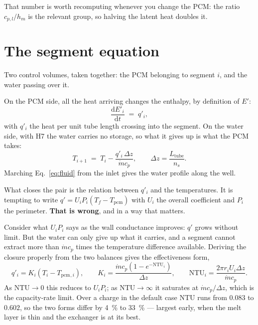 \documentclass[11pt,a4paper]{article}
\newcommand{\md}{\ensuremath{\dot m}}
\newcommand{\Ui}{\ensuremath{U_{i}}}
\newcommand{\hm}{\ensuremath{h_{m}}}
\newcommand{\Tpcm}{\ensuremath{T_{\mathrm{pcm}}}}
\begin{document}
That number is worth recomputing whenever you change the PCM: the ratio
$c_{p,l}/\hm$ is the relevant group, so halving the latent heat doubles it.

\section{The segment equation}
\label{sec:segment}

Two control volumes, taken together: the PCM belonging to segment $i$, and the
water passing over it.

On the PCM side, all the heat arriving changes the enthalpy, by definition of
$E'$:
\begin{equation}
  \frac{\mathrm{d}E'_i}{\mathrm{d}t} \;=\; q'_i ,
  \label{eq:pcm}
\end{equation}
with $q'_i$ the heat per unit tube length crossing into the segment. On the
water side, with H7 the water carries no storage, so what it gives up is what
the PCM takes:
\begin{equation}
  T_{i+1} \;=\; T_i - \frac{q'_i\,\Delta z}{\md c_p},
  \qquad \Delta z = \frac{L_{\mathrm{tube}}}{n_s}.
  \label{eq:fluid}
\end{equation}
Marching Eq.~\eqref{eq:fluid} from the inlet gives the water profile along the
well.

What closes the pair is the relation between $q'_i$ and the temperatures. It is
tempting to write $q' = \Ui P_i (T_f - \Tpcm)$ with $\Ui$ the overall
coefficient and $P_i$ the perimeter. \textbf{That is wrong}, and in a way that
matters.

Consider what $\Ui P_i$ says as the wall conductance improves: $q'$ grows
without limit. But the water can only give up what it carries, and a segment
cannot extract more than $\md c_p$ times the temperature difference available.
Deriving the closure properly from the two balances gives the effectiveness
form,
\begin{equation}
  \boxed{\;
  q'_i = K_i\left(T_i - \Tpcm{}_{,i}\right),
  \qquad
  K_i = \frac{\md c_p\left(1-e^{-\mathrm{NTU}_i}\right)}{\Delta z},
  \qquad
  \mathrm{NTU}_i = \frac{2\pi r_i \Ui \Delta z}{\md c_p}. \;}
  \label{eq:K}
\end{equation}
As $\mathrm{NTU}\to0$ this reduces to $\Ui P_i$; as $\mathrm{NTU}\to\infty$ it
saturates at $\md c_p/\Delta z$, which is the capacity-rate limit. Over a charge
in the default case $\mathrm{NTU}$ runs from $0.083$ to $0.602$, so the two
forms differ by \SI{4}{\percent} to \SI{33}{\percent} --- largest early, when
the melt layer is thin and the exchanger is at its best.
\end{document}
